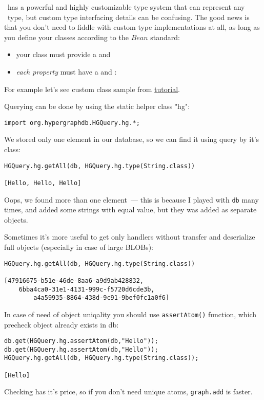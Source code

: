 
\hgdb\ has a powerful and highly customizable type system that can represent any
\java\ type, but custom type interfacing details can be confusing. The good news
is that you don't need to fiddle with custom type implementations at all,
as long as you define your classes according to the \java$Bean$ standard:
\begin{itemize}[nosep]
\item your class must provide a  and
\item \emph{each property} must have a  and :
\end{itemize}

For example let's see custom class sample from
\href{https://github.com/hypergraphdb/hypergraphdb/wiki/GettingStarted}{tutorial}.

\clearpage
{}

Querying can be done by using the static helper class "hg":
\begin{verbatim}
import org.hypergraphdb.HGQuery.hg.*;
\end{verbatim}

We stored only one element in our database, so we can find it using query by
it's class:
\begin{verbatim}
HGQuery.hg.getAll(db, HGQuery.hg.type(String.class))

[Hello, Hello, Hello]
\end{verbatim}

Oops, we found more than one element\ --- this is because I played with
\verb$db$ many times, and added some strings with equal value, but they was
added as separate objects.

\clearpage
Sometimes it's more useful to get only handlers without transfer and deserialize
full objects (especially in case of large BLOBs):
\begin{verbatim}
HGQuery.hg.getAll(db, HGQuery.hg.type(String.class))

[47916675-b51e-46de-8aa6-a9d9ab428832, 
    6bba4ca0-31e1-4131-999c-f5720d6cde3b, 
        a4a59935-8864-438d-9c91-9bef0fc1a0f6]
\end{verbatim}

\clearpage
{}

In case of need of object uniqality you should use \verb$assertAtom()$ function,
which precheck object already exists in db:
\begin{verbatim}
db.get(HGQuery.hg.assertAtom(db,"Hello"));
db.get(HGQuery.hg.assertAtom(db,"Hello"));
HGQuery.hg.getAll(db, HGQuery.hg.type(String.class));

[Hello]
\end{verbatim}
Checking has it's price, so if you don't need unique atoms, \verb$graph.add$ is
faster.

\secup